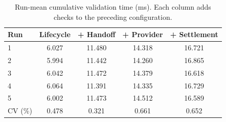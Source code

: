 \begin{table}[!t]
\centering
\caption{Run-mean cumulative validation time (ms).
Each column adds checks to the preceding configuration.}
\label{tab:f-run-means}
\footnotesize
\renewcommand{\arraystretch}{1.08}
\setlength{\tabcolsep}{3pt}
\begin{tabular*}{\columnwidth}{@{\hspace{3pt}}l@{\extracolsep{\fill}}cccc@{\hspace{3pt}}}
\toprule
\textbf{Run} & \textbf{Lifecycle} & \textbf{+ Handoff}
& \textbf{+ Provider} & \textbf{+ Settlement} \\
\midrule
1 & 6.027 & 11.480 & 14.318 & 16.721 \\
2 & 5.994 & 11.442 & 14.260 & 16.865 \\
3 & 6.042 & 11.472 & 14.379 & 16.618 \\
4 & 6.064 & 11.391 & 14.335 & 16.729 \\
5 & 6.002 & 11.473 & 14.512 & 16.589 \\
\midrule
CV (\%) & 0.478 & 0.321 & 0.661 & 0.652 \\
\bottomrule
\end{tabular*}
\end{table}
